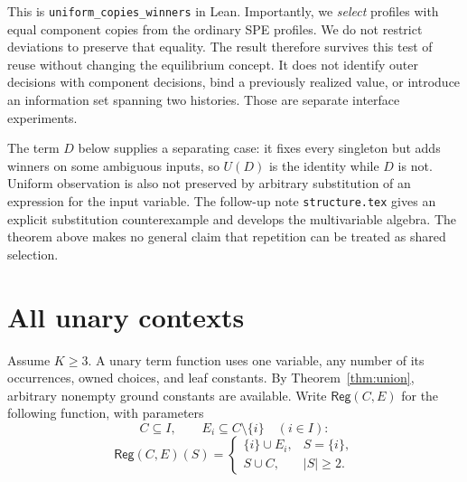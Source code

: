 \documentclass[11pt]{article}
\begin{document}
This is \texttt{uniform\_copies\_winners} in Lean. Importantly, we
\emph{select} profiles with equal component copies from the ordinary SPE
profiles. We do not restrict deviations to preserve that equality. The
result therefore survives this test of reuse without changing the
equilibrium concept. It does not identify outer decisions with component
decisions, bind a previously realized value, or introduce an information
set spanning two histories. Those are separate interface experiments.

The term $D$ below supplies a separating case: it fixes every singleton
but adds winners on some ambiguous inputs, so $U(D)$ is the identity
while $D$ is not. Uniform observation is also not preserved by arbitrary
substitution of an expression for the input variable. The follow-up note
\texttt{structure.tex} gives an explicit substitution counterexample and
develops the multivariable algebra. The theorem above makes no general
claim that repetition can be treated as shared selection.

\section{All unary contexts}

Assume $K\geq3$. A unary term function uses one variable, any number of
its occurrences, owned choices, and leaf constants. By
Theorem~\ref{thm:union}, arbitrary nonempty ground constants are available.
Write $\mathsf{Reg}(C,E)$ for the following function, with parameters
\[
 C\subseteq I,\qquad E_i\subseteq C\setminus\{i\}\quad(i\in I):
\]
\begin{equation}\label{eq:normal}
 \mathsf{Reg}(C,E)(S)=
 \begin{cases}
 \{i\}\cup E_i,&S=\{i\},\\
 S\cup C,&|S|\geq2.
 \end{cases}
\end{equation}
\end{document}
